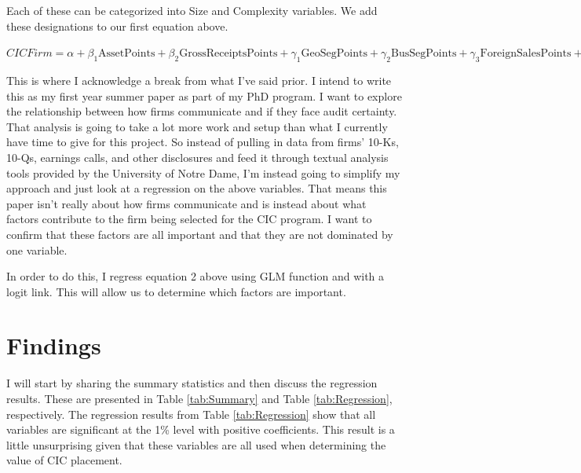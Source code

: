 \documentclass[12pt]{article}
\begin{document}
Each of these can be categorized into Size and Complexity variables. We add these designations to our first equation above.
\vspace{\baselineskip}
\begin{center}
\(CICFirm = \alpha  + \beta_1 \text{AssetPoints}  + \beta_2 \text{GrossReceiptsPoints} + \gamma_1 \text{GeoSegPoints} + \gamma_2 \text{BusSegPoints} + \gamma_3 \text{ForeignSalesPoints} + \gamma_4 \text{ForeignTaxPoints} + \epsilon\)
\begin{equation}
\label{eq:CICComp}
\end{equation}
\end{center}
\vspace{\baselineskip}

This is where I acknowledge a break from what I've said prior. I intend to write this as my first year summer paper as part of my PhD program. I want to explore the relationship between how firms communicate and if they face audit certainty. That analysis is going to take a lot more work and setup than what I currently have time to give for this project. So instead of pulling in data from firms' 10-Ks, 10-Qs, earnings calls, and other disclosures and feed it through textual analysis tools provided by the University of Notre Dame, I'm instead going to simplify my approach and just look at a regression on the above variables. That means this paper isn't really about how firms communicate and is instead about what factors contribute to the firm being selected for the CIC program. I want to confirm that these factors are all important and that they are not dominated by one variable.
\vspace{\baselineskip}

In order to do this, I regress equation 2 above using GLM function and with a logit link. This will allow us to determine which factors are important.


\section{Findings}
I will start by sharing the summary statistics and then discuss the regression results. These are presented in Table \ref{tab:Summary} and Table \ref{tab:Regression}, respectively. The regression results from Table \ref{tab:Regression} show that all variables are significant at the 1\% level with positive coefficients. This result is a little unsurprising given that these variables are all used when determining the value of CIC placement.
\vspace{\baselineskip}
\end{document}
